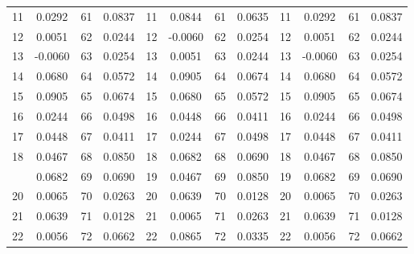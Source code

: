 \documentclass{article}
\begin{document}
\begin{longtable}[c]{cccccccccccc}
	11        & 0.0292       & 61            & 0.0837            & 11       & 0.0844        & 61            & 0.0635            & 11       & 0.0292        & 61            & 0.0837            \\
	12        & 0.0051       & 62            & 0.0244            & 12       & -0.0060       & 62            & 0.0254            & 12       & 0.0051        & 62            & 0.0244            \\
	13        & -0.0060      & 63            & 0.0254            & 13       & 0.0051        & 63            & 0.0244            & 13       & -0.0060       & 63            & 0.0254            \\
	14        & 0.0680       & 64            & 0.0572            & 14       & 0.0905        & 64            & 0.0674            & 14       & 0.0680        & 64            & 0.0572            \\
	15        & 0.0905       & 65            & 0.0674            & 15       & 0.0680        & 65            & 0.0572            & 15       & 0.0905        & 65            & 0.0674            \\
	16        & 0.0244       & 66            & 0.0498            & 16       & 0.0448        & 66            & 0.0411            & 16       & 0.0244        & 66            & 0.0498            \\
	17        & 0.0448       & 67            & 0.0411            & 17       & 0.0244        & 67            & 0.0498            & 17       & 0.0448        & 67            & 0.0411            \\
	18        & 0.0467       & 68            & 0.0850            & 18       & 0.0682        & 68            & 0.0690            & 18       & 0.0467        & 68            & 0.0850            \\
	\bottomrule
	\newpage
	\toprule
	19        & 0.0682       & 69            & 0.0690            & 19       & 0.0467        & 69            & 0.0850            & 19       & 0.0682        & 69            & 0.0690            \\
	20        & 0.0065       & 70            & 0.0263            & 20       & 0.0639        & 70            & 0.0128            & 20       & 0.0065        & 70            & 0.0263            \\
	21        & 0.0639       & 71            & 0.0128            & 21       & 0.0065        & 71            & 0.0263            & 21       & 0.0639        & 71            & 0.0128            \\
	22        & 0.0056       & 72            & 0.0662            & 22       & 0.0865        & 72            & 0.0335            & 22       & 0.0056        & 72            & 0.0662            \\

\end{longtable}
\end{document}

